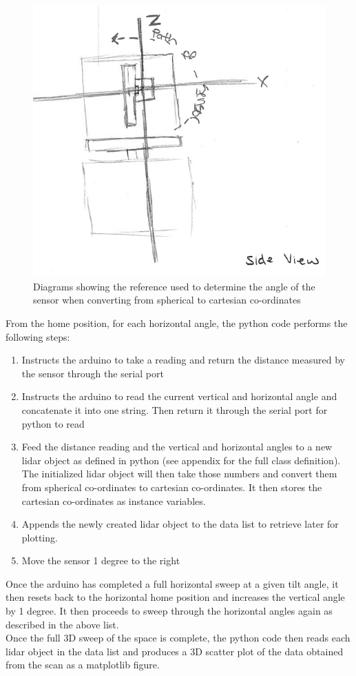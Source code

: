 \documentclass{article}
\begin{document}
\begin{figure}[h!]
\begin{center}
\includegraphics[scale=0.3]{SideView.PNG}
\caption{Diagrams showing the reference used to determine the angle of the sensor when converting from spherical to cartesian co-ordinates}
\end{center}
\end{figure}

From the home position, for each horizontal angle, the python code performs the following steps:

\begin{enumerate}
\item Instructs the arduino to take a reading and return the distance measured by the sensor through the serial port
\item Instructs the arduino to read the current vertical and horizontal angle and concatenate it into one string. Then return it through the serial port for python to read
\item Feed the distance reading and the vertical and horizontal angles to a new lidar object as defined in python (see appendix for the full class definition). The initialized lidar object will then take those numbers and convert them from spherical co-ordinates to cartesian co-ordinates. It then stores the cartesian co-ordinates as instance variables.
\item Appends the newly created lidar object to the data list to retrieve later for plotting.
\item Move the sensor 1 degree to the right
\end{enumerate}

Once the arduino has completed a full horizontal sweep at a given tilt angle, it then resets back to the horizontal home position and increases the vertical angle by 1 degree. It then proceeds to sweep through the horizontal angles again as described in the above list. \\

Once the full 3D sweep of the space is complete, the python code then reads each lidar object in the data list and produces a 3D scatter plot of the data obtained from the scan as a matplotlib figure.
\end{document}

